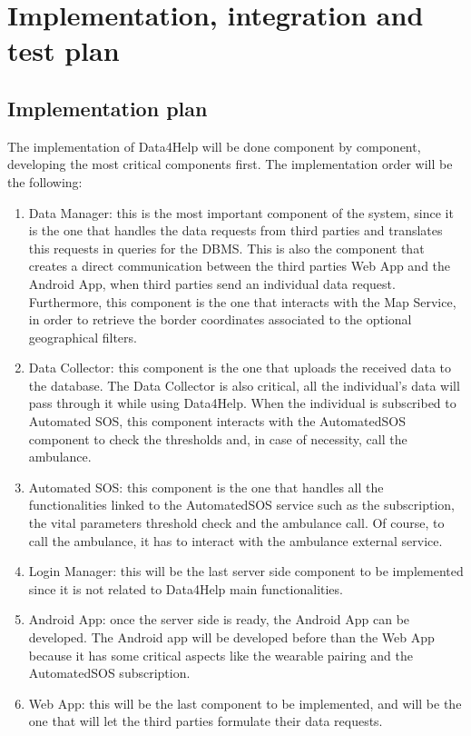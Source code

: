 \chapter{Implementation, integration and test plan}\label{c:impltest}
\section{Implementation plan}
The implementation of Data4Help will be done component by component, developing the most critical components first.
The implementation order will be the following:
\begin{enumerate}
\item Data Manager: this is the most important component of the system, since it is the one that handles the data requests from third parties and translates this requests in queries for the DBMS. 
This is also the component that creates a direct communication between the third parties Web App and the Android App, when third parties send an individual data request.\\
Furthermore, this component is the one that interacts with the Map Service, in order to retrieve the border coordinates associated to the optional geographical filters.
\item Data Collector: this component is the one that uploads the received data to the database. The Data Collector is also critical, all the individual's data will pass through it while using Data4Help. 
When the individual is subscribed to Automated SOS, this component interacts with the AutomatedSOS component to check the thresholds and, in case of necessity, call the ambulance.
\item Automated SOS: this component is the one that handles all the functionalities linked to the AutomatedSOS service such as the subscription, the vital parameters threshold check and the ambulance call. Of course, to call the ambulance, it has to interact with the ambulance external service.
\item Login Manager: this will be the last server side component to be implemented since it is not related to Data4Help main functionalities.
\item Android App: once the server side is ready, the Android App can be developed. The Android app will be developed before than the Web App because it has some critical aspects like the wearable pairing and the AutomatedSOS subscription.
\item Web App: this will be the last component to be implemented, and will be the one that will let the third parties formulate their data requests.
\end{enumerate}

